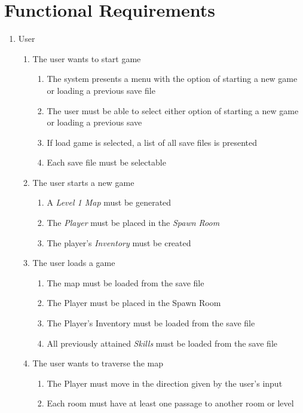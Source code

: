 \documentclass[12pt, titlepage]{article}
\begin{document}
\section{Functional Requirements}

\begin{enumerate}[{VP}1.]
  \item User
  \begin{enumerate}[{BE1}.1]
    \item The user wants to start game
    \begin{enumerate}
      \item The system presents a menu with the option of starting a new game or loading a previous save file
      \item The user must be able to select either option of starting a new game or loading a previous save
      \item If load game is selected, a list of all save files is presented
      \item Each save file must be selectable
    \end{enumerate}
    \item The user starts a new game
    \begin{enumerate}
      \item A \textit{Level 1 Map} must be generated
      \item The \textit{Player} must be placed in the \textit{Spawn Room}
      \item The player's \textit{Inventory} must be created
    \end{enumerate}
    \item The user loads a game
    \begin{enumerate}
      \item The map must be loaded from the save file
      \item The Player must be placed in the Spawn Room
      \item The Player's Inventory must be loaded from the save file
      \item All previously attained \textit{Skills} must be loaded from the save file
    \end{enumerate}
    \item The user wants to traverse the map
    \begin{enumerate}
      \item The Player must move in the direction given by the user's input
      \item Each room must have at least one passage to another room or level

\end{enumerate}
\end{enumerate}
\end{enumerate}
\end{document}
